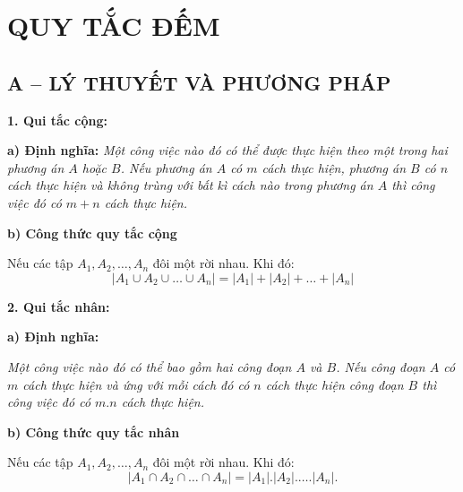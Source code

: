 
\section*{QUY TẮC ĐẾM}
\subsection*{A -- LÝ THUYẾT VÀ PHƯƠNG PHÁP}

\textbf{1. Qui tắc cộng:}

\textbf{a) Định nghĩa:} \textit{Một công việc nào đó có thể được thực hiện theo một trong hai phương án $A$ hoặc $B$. Nếu phương án $A$ có $m$ cách thực hiện, phương án $B$ có $n$ cách thực hiện và không trùng với bất kì cách nào trong phương án $A$ thì công việc đó có $m+n$ cách thực hiện.}

\textbf{b) Công thức quy tắc cộng}

Nếu các tập $A_1,A_2,\ldots,A_n$ đôi một rời nhau. Khi đó:
\[\left|A_1\cup A_2\cup\ldots\cup A_n\right|=\left|A_1\right|+\left|A_2\right|+\ldots+\left|A_n\right|\]

\textbf{2. Qui tắc nhân:}

\textbf{a) Định nghĩa:}

\textit{Một công việc nào đó có thể bao gồm hai công đoạn $A$ và $B$. Nếu công đoạn $A$ có $m$ cách thực hiện và ứng với mỗi cách đó có $n$ cách thực hiện công đoạn $B$ thì công việc đó có $m.n$ cách thực hiện.}

\textbf{b) Công thức quy tắc nhân}

Nếu các tập $A_1,A_2,\ldots,A_n$ đôi một rời nhau. Khi đó:
\[\left|A_1\cap A_2\cap\ldots\cap A_n\right|=\left|A_1\right|.\left|A_2\right|.\ldots.\left|A_n\right|.\]

